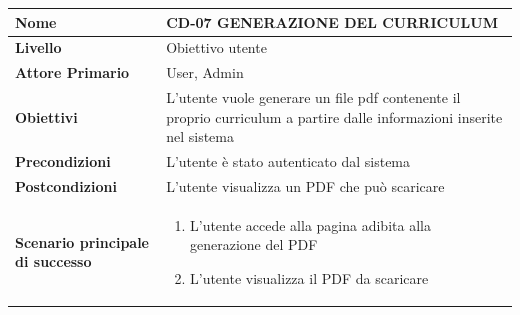 \begin{center}
    \begin{tabular}{|p{0.3\linewidth}|p{0.7\linewidth}|}
    \hline
    \rowcolor{Blue}
    \textbf{Nome} & CD-07 GENERAZIONE DEL CURRICULUM \\
    \hline
    \rowcolor{DarkBlue}
    \textbf{Livello} & Obiettivo utente \\
    \hline
    \rowcolor{LightBlue}
    \textbf{Attore Primario} & User, Admin \\
    \hline
    \rowcolor{LightBlue}
    \textbf{Obiettivi} & L’utente vuole generare un file pdf contenente il proprio curriculum a partire dalle informazioni inserite nel sistema \\
    \hline
    \rowcolor{Blue}
    \textbf{Precondizioni} & L’utente è stato autenticato dal sistema \\
    \hline
    \rowcolor{LightBlue}
    \textbf{Postcondizioni} & L’utente visualizza un PDF che può scaricare \\
    \hline
    \rowcolor{LighterBlue}
        \begin{center}
        \textbf{Scenario principale di successo}
    \end{center} 
    &
    \begin{enumerate}
        \item L’utente accede alla pagina adibita alla generazione del PDF
        \item L’utente visualizza il PDF da scaricare
    \end{enumerate}
    \\
    \hline
    \end{tabular}
\end{center}

